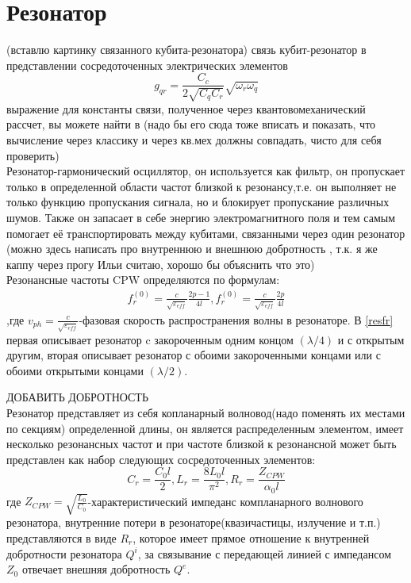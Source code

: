\documentclass[12pt, twoside]{report}
\begin{document}
	\section{Резонатор}
(вставлю картинку связанного кубита-резонатора)
связь кубит-резонатор в представлении сосредоточенных электрических элементов
	\begin{equation}
	g_{qr}=\frac{C_c}{2\sqrt{C_q C_r}}\sqrt{\omega_r \omega_q}
	\label{eq:g_qr}
	\end{equation}
выражение для константы связи, полученное через квантовомеханический рассчет, вы можете найти в \cite{Koch2007}(надо бы его сюда тоже вписать и показать, что вычисление через классику и через кв.мех должны совпадать, чисто для себя проверить)\\
Резонатор-гармонический осциллятор, он используется как фильтр, он пропускает только в определенной области частот близкой к резонансу,т.е. он выполняет не только функцию пропускания сигнала, но и блокирует пропускание 
различных шумов\cite{Naturwissenschaften2013}. Также он запасает в себе энергию электромагнитного поля и тем самым помогает её транспортировать между кубитами, связанными через один резонатор \cite{Kelly2015}
(можно здесь написать про внутреннюю и внешнюю добротность , т.к. я же каппу через прогу Ильи считаю, хорошо бы объяснить что это) \\
Резонансные частоты CPW определяются по формулам:
	\begin{align}
	\label{resfr}
	f^{(0)}_r=\frac{c}{\sqrt{\varepsilon_{eff}}}\frac{2p-1}{4l}, 
	f^{(0)}_r=\frac{c}{\sqrt{\varepsilon_{eff}}}\frac{2p}{4l}
	\end{align}
,где $v_{ph}=\frac{c}{\sqrt{\varepsilon_{eff}}}$-фазовая скорость распространения волны в резонаторе. В \eqref{resfr} первая описывает резонатор c закороченным одним концом $(\lambda/4)$ и с открытым другим, вторая описывает резонатор с обоими закороченными концами или с обоими открытыми концами $(\lambda/2)$. 
	
ДОБАВИТЬ ДОБРОТНОСТЬ\\
Резонатор представляет из себя копланарный волновод(надо поменять их местами по секциям) определенной длины, он является распределенным элементом, имеет несколько резонансных частот и при частоте близкой к резонансной может быть представлен как набор следующих сосредоточенных элементов:
	\begin{equation}
	C_r=\frac{C_0 l}{2},
	L_r=\frac{8L_0 l}{\pi^2},
	R_r=\frac{Z_{CPW}}{\alpha_0 l}
	\end{equation}
где $Z_{CPW}=\sqrt{\frac{L_0}{C_0}}$-характеристический импеданс компланарного волнового резонатора, внутренние потери в резонаторе(квазичастицы, излучение и т.п.) представляются в виде $R_r$, которое имеет прямое отношение к внутренней добротности резонатора $Q^i$, за связывание с передающей линией с импедансом $Z_0$ отвечает внешняя добротность $Q^e$.
\end{document}
